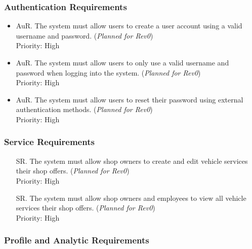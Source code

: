 \documentclass[12pt]{article}
\newcounter{authreqnum} %
\newcounter{servicereqnum} %
\newcommand{\rev}[1]{(\textit{Planned for Rev#1})}
\begin{document}
\subsubsection{Authentication Requirements}

\noindent \begin {itemize}

    \item[AuR\refstepcounter{authreqnum}\theauthreqnum \label{R_Output}.] The system must allow users to create a user account using a valid username and password. \rev{0} \\
    Priority: High
    
    \item[AuR\refstepcounter{authreqnum}\theauthreqnum \label{R_Output}.] The system must allow users to only use a valid username and password when logging into the system. \rev{0} \\
    Priority: High
    
    \item[AuR\refstepcounter{authreqnum}\theauthreqnum \label{R_Output}.] The system must allow users to reset their password using external authentication methods. \rev{0} \\
    Priority: High

\end {itemize}

\subsubsection{Service Requirements}
\begin{itemize}

    \item[SR\refstepcounter{servicereqnum}\theservicereqnum \label{R_Output}.] The system must allow shop owners to create and edit vehicle services their shop offers. \rev{0} \\
    Priority: High
    
    \item[SR\refstepcounter{servicereqnum}\theservicereqnum \label{R_Output}.] The system must allow shop owners and employees to view all vehicle services their shop offers. \rev{0} \\
    Priority: High


\end{itemize}

\subsubsection{Profile and Analytic Requirements}
\end{document}
